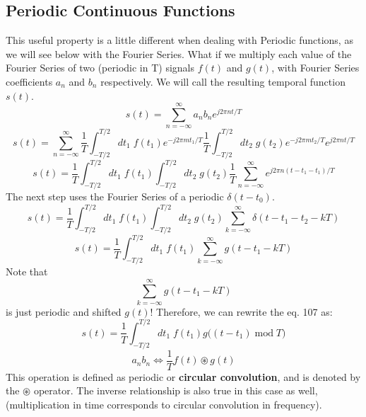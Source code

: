 \documentclass[a4paper]{article}
\numberwithin{equation}{section}
\begin{document}
\subsection{Periodic Continuous Functions}
This useful property is a little different when dealing with Periodic functions, as we will see below with the Fourier Series. What if we multiply each value of the Fourier Series of two (periodic in T) signals $f(t)$ and $g(t)$, with Fourier Series coefficients $a_n$ and $b_n$ respectively. We will call the resulting temporal function $s(t)$. 
\begin{equation}
s(t)=\sum_{n=-\infty}^{\infty}a_n b_n e^{j2\pi nt/T} 
\end{equation}
\begin{equation}
s(t)= \sum_{n=-\infty}^{\infty}\frac{1}{T}\int_{-T/2}^{T/2}dt_1\; f(t_1)e^{-j2\pi mt_1/T}\frac{1}{T}\int_{-T/2}^{T/2}dt_2\; g(t_2)e^{-j2\pi mt_2/T}e^{j2\pi nt/T} 
\end{equation}
\begin{equation}
s(t)= \frac{1}{T}\int_{-T/2}^{T/2}dt_1\; f(t_1)\int_{-T/2}^{T/2}dt_2\; g(t_2)\frac{1}{T}\sum_{n=-\infty}^{\infty}e^{j2\pi n(t-t_1-t_1)/T} 
\end{equation}
The next step uses the Fourier Series of a periodic $\delta(t-t_0)$. 
\begin{equation}
s(t)= \frac{1}{T}\int_{-T/2}^{T/2}dt_1\; f(t_1)\int_{-T/2}^{T/2}dt_2\; g(t_2)\sum_{k=-\infty}^{\infty}\delta(t-t_1-t_2-kT)
\end{equation}
\begin{equation}
s(t)= \frac{1}{T}\int_{-T/2}^{T/2}dt_1\; f(t_1)\sum_{k=-\infty}^{\infty}g(t-t_1-kT)
\end{equation}
Note that
\begin{equation}
\sum_{k=-\infty}^{\infty}g(t-t_1-kT)
\end{equation}
is just periodic and shifted $g(t)$! Therefore, we can rewrite the eq. 107 as:
\begin{equation}
s(t)= \frac{1}{T}\int_{-T/2}^{T/2}dt_1\; f(t_1)g\big((t-t_1)\; \text{mod}\; T\big)
\end{equation}
\begin{equation}
\boxed{
a_nb_n\Longleftrightarrow \frac{1}{T}f(t)\circledast g(t)}
\end{equation}
This operation is defined as periodic or \textbf{circular convolution}, and is denoted by the $\circledast$ operator. The inverse relationship is also true in this case as well, (multiplication in time corresponds to circular convolution in frequency). 
\end{document}
